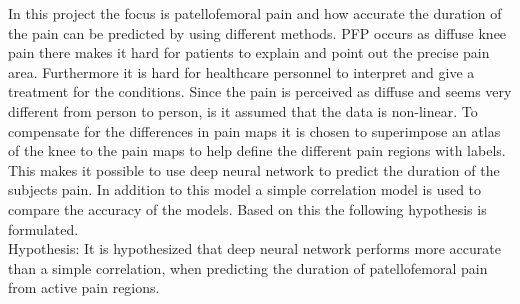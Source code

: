 
In this project the focus is patellofemoral pain and how accurate the duration of the pain can be predicted by using different methods. PFP occurs as diffuse knee pain there makes it hard for patients to explain and point out the precise pain area. Furthermore it is hard for healthcare personnel to interpret and give a treatment for the conditions. Since the pain is perceived as diffuse and seems very different from person to person, is it assumed that the data is non-linear. To compensate for the differences in pain maps it is chosen to superimpose an atlas of the knee to the pain maps to help define the different pain regions with labels. This makes it possible to use deep neural network to predict the duration of the subjects pain. In addition to this model a simple correlation model is used to compare the accuracy of the models. Based on this the following hypothesis is formulated.\\

\noindent
Hypothesis: It is hypothesized that deep neural network performs more accurate than a simple correlation, when predicting the duration of patellofemoral pain from active pain regions.
